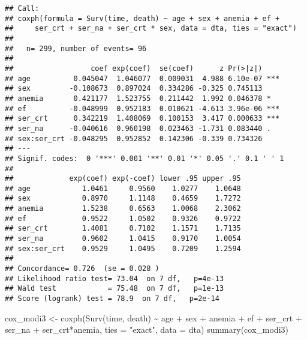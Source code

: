 \documentclass[
]{article}
\newenvironment{Shaded}{\begin{snugshade}}{\end{snugshade}}
\newcommand{\AttributeTok}[1]{\textcolor[rgb]{0.77,0.63,0.00}{#1}}
\newcommand{\FunctionTok}[1]{\textcolor[rgb]{0.00,0.00,0.00}{#1}}
\newcommand{\NormalTok}[1]{#1}
\newcommand{\OtherTok}[1]{\textcolor[rgb]{0.56,0.35,0.01}{#1}}
\newcommand{\SpecialCharTok}[1]{\textcolor[rgb]{0.00,0.00,0.00}{#1}}
\newcommand{\StringTok}[1]{\textcolor[rgb]{0.31,0.60,0.02}{#1}}
\begin{document}
\begin{verbatim}
## Call:
## coxph(formula = Surv(time, death) ~ age + sex + anemia + ef + 
##     ser_crt + ser_na + ser_crt * sex, data = dta, ties = "exact")
## 
##   n= 299, number of events= 96 
## 
##                  coef exp(coef)  se(coef)      z Pr(>|z|)    
## age          0.045047  1.046077  0.009031  4.988 6.10e-07 ***
## sex         -0.108673  0.897024  0.334286 -0.325 0.745113    
## anemia       0.421177  1.523755  0.211442  1.992 0.046378 *  
## ef          -0.048999  0.952183  0.010621 -4.613 3.96e-06 ***
## ser_crt      0.342219  1.408069  0.100153  3.417 0.000633 ***
## ser_na      -0.040616  0.960198  0.023463 -1.731 0.083440 .  
## sex:ser_crt -0.048295  0.952852  0.142306 -0.339 0.734326    
## ---
## Signif. codes:  0 '***' 0.001 '**' 0.01 '*' 0.05 '.' 0.1 ' ' 1
## 
##             exp(coef) exp(-coef) lower .95 upper .95
## age            1.0461     0.9560    1.0277    1.0648
## sex            0.8970     1.1148    0.4659    1.7272
## anemia         1.5238     0.6563    1.0068    2.3062
## ef             0.9522     1.0502    0.9326    0.9722
## ser_crt        1.4081     0.7102    1.1571    1.7135
## ser_na         0.9602     1.0415    0.9170    1.0054
## sex:ser_crt    0.9529     1.0495    0.7209    1.2594
## 
## Concordance= 0.726  (se = 0.028 )
## Likelihood ratio test= 73.04  on 7 df,   p=4e-13
## Wald test            = 75.48  on 7 df,   p=1e-13
## Score (logrank) test = 78.9  on 7 df,   p=2e-14
\end{verbatim}

\begin{Shaded}
\begin{Highlighting}[]
\NormalTok{cox\_modi3 }\OtherTok{\textless{}{-}} \FunctionTok{coxph}\NormalTok{(}\FunctionTok{Surv}\NormalTok{(time, death) }\SpecialCharTok{\textasciitilde{}}\NormalTok{ age }\SpecialCharTok{+}\NormalTok{ sex }\SpecialCharTok{+}\NormalTok{ anemia }\SpecialCharTok{+}\NormalTok{ ef }\SpecialCharTok{+}\NormalTok{ ser\_crt }\SpecialCharTok{+}\NormalTok{ ser\_na }\SpecialCharTok{+}\NormalTok{ ser\_crt}\SpecialCharTok{*}\NormalTok{anemia, }\AttributeTok{ties =} \StringTok{"exact"}\NormalTok{, }\AttributeTok{data =}\NormalTok{ dta)}
\FunctionTok{summary}\NormalTok{(cox\_modi3)}
\end{Highlighting}
\end{Shaded}
\end{document}
